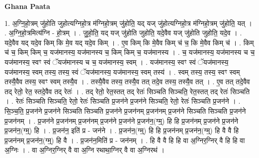 \documentclass[17pt]{extarticle}
\begin{document}
\textbf{Ghana Paata } \newline

1. अ॒ग्नि॒हो॒त्रम् जु॑होति जुहोत्यग्निहो॒त्र म॑ग्निहो॒त्रम् जु॑होति॒ यद् यज् जु॑होत्यग्निहो॒त्र म॑ग्निहो॒त्रम् जु॑होति॒ यत् । . अ॒ग्नि॒हो॒त्रमित्य॑ग्नि - हो॒त्रम् । . जु॒हो॒ति॒ यद् यज् जु॑होति जुहोति॒ यदे॒वैव यज् जु॑होति जुहोति॒ यदे॒व । . यदे॒वैव यद् यदे॒व किम् कि मे॒व यद् यदे॒व किम् । . ए॒व किम् कि मे॒वैव किम् च॑ च॒ कि मे॒वैव किम् च॑ । . किम् च॑ च॒ किम् किम् च॒ यज॑मानस्य॒ यज॑मानस्य च॒ किम् किम् च॒ यज॑मानस्य । . च॒ यज॑मानस्य॒ यज॑मानस्य च च॒ यज॑मानस्य॒ स्वꣳ स्वं ॅयज॑मानस्य च च॒ यज॑मानस्य॒ स्वम् । . यज॑मानस्य॒ स्वꣳ स्वं ॅयज॑मानस्य॒ यज॑मानस्य॒ स्वम् तस्य॒ तस्य॒ स्वं ॅयज॑मानस्य॒ यज॑मानस्य॒ स्वम् तस्य॑ । . स्वम् तस्य॒ तस्य॒ स्वꣳ स्वम् तस्यै॒वैव तस्य॒ स्वꣳ स्वम् तस्यै॒व । . तस्यै॒वैव तस्य॒ तस्यै॒व तत् तदे॒व तस्य॒ तस्यै॒व तत् । . ए॒व तत् तदे॒वैव तद् रेतो॒ रेत॒ स्तदे॒वैव तद् रेतः॑ । . तद् रेतो॒ रेत॒स्तत् तद् रेतः॑ सिञ्चति सिञ्चति॒ रेत॒स्तत् तद् रेतः॑ सिञ्चति । . रेतः॑ सिञ्चति सिञ्चति॒ रेतो॒ रेतः॑ सिञ्चति प्र॒जन॑ने प्र॒जन॑ने सिञ्चति॒ रेतो॒ रेतः॑ सिञ्चति प्र॒जन॑ने । . सि॒ञ्च॒ति॒ प्र॒जन॑ने प्र॒जन॑ने सिञ्चति सिञ्चति प्र॒जन॑ने प्र॒जन॑नम् प्र॒जन॑नम् प्र॒जन॑ने सिञ्चति सिञ्चति प्र॒जन॑ने प्र॒जन॑नम् । . प्र॒जन॑ने प्र॒जन॑नम् प्र॒जन॑नम् प्र॒जन॑ने प्र॒जन॑ने प्र॒जन॑न॒(ग्म्॒) हि हि प्र॒जन॑नम् प्र॒जन॑ने प्र॒जन॑ने प्र॒जन॑न॒(ग्म्॒) हि । . प्र॒जन॑न॒ इति॑ प्र - जन॑ने । . प्र॒जन॑न॒(ग्म्॒) हि हि प्र॒जन॑नम् प्र॒जन॑न॒(ग्म्॒) हि वै वै हि प्र॒जन॑नम् प्र॒जन॑न॒(ग्म्॒) हि वै । . प्र॒जन॑न॒मिति॑ प्र - जन॑नम् । . हि वै वै हि हि वा अ॒ग्निर॒ग्निर् वै हि हि वा अ॒ग्निः । . वा अ॒ग्निर॒ग्निर् वै वा अ॒ग्नि रथाथा॒ग्निर् वै वा अ॒ग्निरथ॑ । \newline
\end{document}
